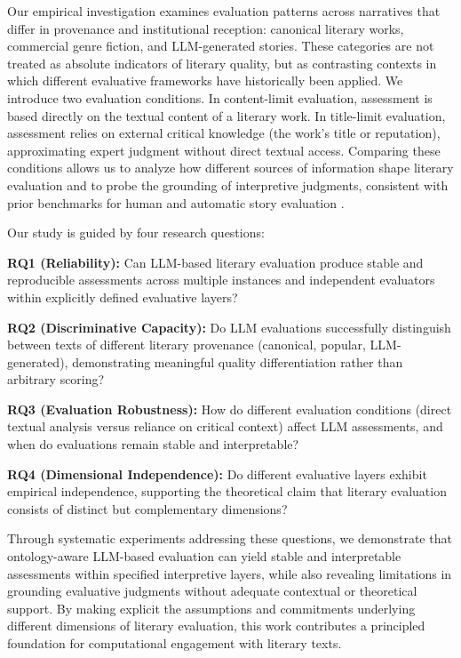 Our empirical investigation examines evaluation patterns across narratives that differ in provenance and institutional reception: canonical literary works, commercial genre fiction, and LLM-generated stories. These categories are not treated as absolute indicators of literary quality, but as contrasting contexts in which different evaluative frameworks have historically been applied. We introduce two evaluation conditions. In content-limit evaluation, assessment is based directly on the textual content of a literary work. In title-limit evaluation, assessment relies on external critical knowledge (the work's title or reputation), approximating expert judgment without direct textual access. Comparing these conditions allows us to analyze how different sources of information shape literary evaluation and to probe the grounding of interpretive judgments, consistent with prior benchmarks for human and automatic story evaluation \cite{chhun2022human,hamilton2025narrabench}.

Our study is guided by four research questions:

\textbf{RQ1 (Reliability):} Can LLM-based literary evaluation produce stable and reproducible assessments across multiple instances and independent evaluators within explicitly defined evaluative layers?

\textbf{RQ2 (Discriminative Capacity):} Do LLM evaluations successfully distinguish between texts of different literary provenance (canonical, popular, LLM-generated), demonstrating meaningful quality differentiation rather than arbitrary scoring?

\textbf{RQ3 (Evaluation Robustness):} How do different evaluation conditions (direct textual analysis versus reliance on critical context) affect LLM assessments, and when do evaluations remain stable and interpretable?

\textbf{RQ4 (Dimensional Independence):} Do different evaluative layers exhibit empirical independence, supporting the theoretical claim that literary evaluation consists of distinct but complementary dimensions?

Through systematic experiments addressing these questions, we demonstrate that ontology-aware LLM-based evaluation can yield stable and interpretable assessments within specified interpretive layers, while also revealing limitations in grounding evaluative judgments without adequate contextual or theoretical support. By making explicit the assumptions and commitments underlying different dimensions of literary evaluation, this work contributes a principled foundation for computational engagement with literary texts.